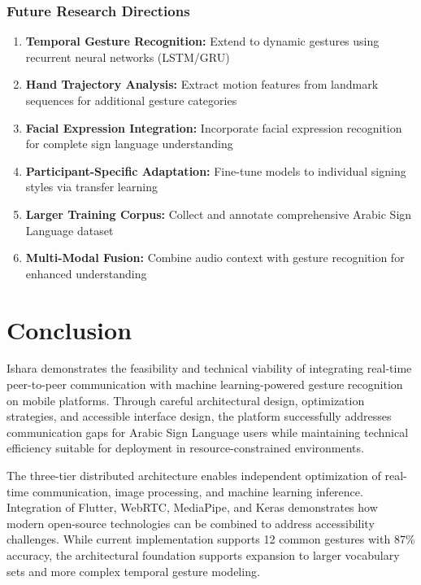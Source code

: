 \documentclass[11pt,a4paper,twoside]{report}
\begin{document}
\subsubsection{Future Research Directions}
\label{subsubsec:future-directions}

\begin{enumerate}
    \item \textbf{Temporal Gesture Recognition:} Extend to dynamic gestures using recurrent neural networks (LSTM/GRU)
    \item \textbf{Hand Trajectory Analysis:} Extract motion features from landmark sequences for additional gesture categories
    \item \textbf{Facial Expression Integration:} Incorporate facial expression recognition for complete sign language understanding
    \item \textbf{Participant-Specific Adaptation:} Fine-tune models to individual signing styles via transfer learning
    \item \textbf{Larger Training Corpus:} Collect and annotate comprehensive Arabic Sign Language dataset
    \item \textbf{Multi-Modal Fusion:} Combine audio context with gesture recognition for enhanced understanding
\end{enumerate}

\section{Conclusion}
\label{sec:conclusion}

Ishara demonstrates the feasibility and technical viability of integrating real-time peer-to-peer communication with machine learning-powered gesture recognition on mobile platforms. Through careful architectural design, optimization strategies, and accessible interface design, the platform successfully addresses communication gaps for Arabic Sign Language users while maintaining technical efficiency suitable for deployment in resource-constrained environments.

The three-tier distributed architecture enables independent optimization of real-time communication, image processing, and machine learning inference. Integration of Flutter, WebRTC, MediaPipe, and Keras demonstrates how modern open-source technologies can be combined to address accessibility challenges. While current implementation supports 12 common gestures with 87\% accuracy, the architectural foundation supports expansion to larger vocabulary sets and more complex temporal gesture modeling.
\end{document}
